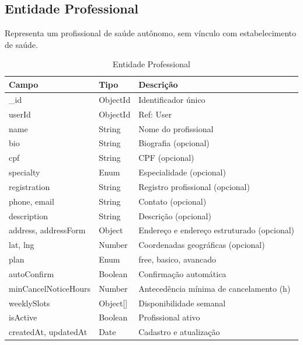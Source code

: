 \subsection{Entidade Professional}
\label{subsec:entity-professional}

Representa um profissional de saúde autônomo,
sem vínculo com estabelecimento de saúde.

\begin{table}[H]
  \centering
  \caption{Entidade Professional}
  \label{tab:entity-professional}
  \begin{tabular}{p{3.8cm}p{2.5cm}p{5.2cm}}
    \toprule
    \textbf{Campo} &
    \textbf{Tipo} &
    \textbf{Descrição} \\
    \midrule
    \_id                 & ObjectId & Identificador único \\
    userId               & ObjectId & Ref: User \\
    name                 & String   & Nome do profissional \\
    bio                  & String   & Biografia (opcional) \\
    cpf                  & String   & CPF (opcional) \\
    specialty            & Enum     & Especialidade (opcional) \\
    registration         & String   & Registro profissional (opcional) \\
    phone, email         & String   & Contato (opcional) \\
    description          & String   & Descrição (opcional) \\
    address, addressForm & Object   & Endereço e endereço
                                      estruturado (opcional) \\
    lat, lng             & Number   & Coordenadas geográficas (opcional) \\
    plan                 & Enum     & free, basico, avancado \\
    autoConfirm          & Boolean  & Confirmação automática \\
    minCancelNoticeHours & Number   & Antecedência mínima de
                                      cancelamento (h) \\
    weeklySlots          & Object[] & Disponibilidade semanal \\
    isActive             & Boolean  & Profissional ativo \\
    createdAt, updatedAt & Date     & Cadastro e atualização \\
    \bottomrule
  \end{tabular}
\end{table}

